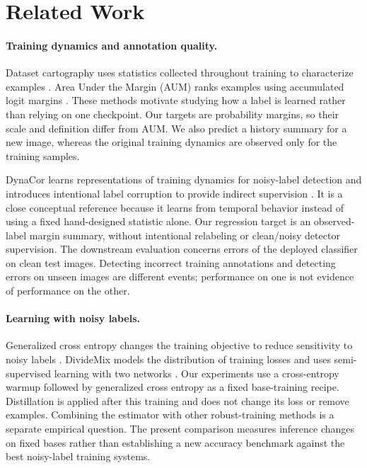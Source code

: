 \section{Related Work}
\paragraph{Training dynamics and annotation quality.}
Dataset cartography uses statistics collected throughout training to characterize examples \citep{swayamdipta2020dataset}. Area Under the Margin (AUM) ranks examples using accumulated logit margins \citep{pleiss2020identifying}. These methods motivate studying how a label is learned rather than relying on one checkpoint. Our targets are probability margins, so their scale and definition differ from AUM. We also predict a history summary for a new image, whereas the original training dynamics are observed only for the training samples.

DynaCor learns representations of training dynamics for noisy-label detection and introduces intentional label corruption to provide indirect supervision \citep{kim2024learning}. It is a close conceptual reference because it learns from temporal behavior instead of using a fixed hand-designed statistic alone. Our regression target is an observed-label margin summary, without intentional relabeling or clean/noisy detector supervision. The downstream evaluation concerns errors of the deployed classifier on clean test images. Detecting incorrect training annotations and detecting errors on unseen images are different events; performance on one is not evidence of performance on the other.

\paragraph{Learning with noisy labels.}
Generalized cross entropy changes the training objective to reduce sensitivity to noisy labels \citep{zhang2018generalized}. DivideMix models the distribution of training losses and uses semi-supervised learning with two networks \citep{li2020dividemix}. Our experiments use a cross-entropy warmup followed by generalized cross entropy as a fixed base-training recipe. Distillation is applied after this training and does not change its loss or remove examples. Combining the estimator with other robust-training methods is a separate empirical question. The present comparison measures inference changes on fixed bases rather than establishing a new accuracy benchmark against the best noisy-label training systems.

